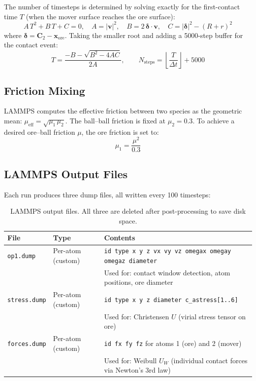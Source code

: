 \documentclass{article}
\begin{document}
The number of timesteps is determined by solving exactly for the first-contact
time $T$ (when the mover surface reaches the ore surface):
\begin{equation}
    A\,T^2 + B\,T + C = 0, \quad
    A = |\mathbf{v}|^2,\quad
    B = 2\,\boldsymbol{\delta}\cdot\mathbf{v},\quad
    C = |\boldsymbol{\delta}|^2 - (R+r)^2
\end{equation}
where $\boldsymbol{\delta} = \mathbf{C}_2 - \mathbf{x}_{\text{ore}}$.
Taking the smaller root and adding a 5000-step buffer for the contact event:
\begin{equation}
    T = \frac{-B - \sqrt{B^2 - 4AC}}{2A}, \qquad
    N_{\text{steps}} = \left\lfloor \frac{T}{\Delta t} \right\rfloor + 5000
\end{equation}

\subsection{Friction Mixing}

LAMMPS computes the effective friction between two species as the geometric mean:
$\mu_{\text{eff}} = \sqrt{\mu_1\,\mu_2}$.
The ball–ball friction is fixed at $\mu_2 = 0.3$.
To achieve a desired ore–ball friction $\mu$, the ore friction is set to:
\begin{equation}
    \mu_1 = \frac{\mu^2}{0.3}
\end{equation}

\subsection{LAMMPS Output Files}

Each run produces three dump files, all written every 100 timesteps:

\begin{table}[h!]
\centering
\begin{tabular}{@{}lll@{}}
\toprule
File & Type & Contents \\
\midrule
\texttt{op1.dump}    & Per-atom (custom) &
    \texttt{id type x y z vx vy vz omegax omegay omegaz diameter} \\
                     & & Used for: contact window detection, atom positions, ore diameter \\[4pt]
\texttt{stress.dump} & Per-atom (custom) &
    \texttt{id type x y z diameter c\_astress[1..6]} \\
                     & & Used for: Christensen $U$ (virial stress tensor on ore) \\[4pt]
\texttt{forces.dump} & Per-atom (custom) &
    \texttt{id fx fy fz} for atoms 1 (ore) and 2 (mover) \\
                     & & Used for: Weibull $U_W$ (individual contact forces via Newton's 3rd law) \\
\bottomrule
\end{tabular}
\caption{LAMMPS output files. All three are deleted after post-processing to save disk space.}
\end{table}
\end{document}
